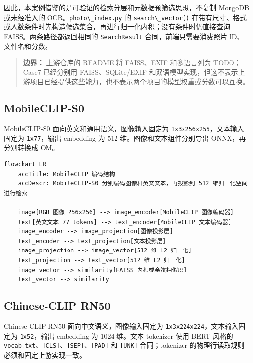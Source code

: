 因此，本案例借鉴的是可验证的检索分层和元数据预筛选思想，不复制 MongoDB
或未经准入的 OCR。\passthrough{\lstinline!photo\_index.py!} 的
\passthrough{\lstinline!search\_vector()!}
在带有尺寸、格式或人数条件时先构造候选集合，再进行归一化内积；没有条件时仍直接查询
FAISS。两条路径都返回相同的 \passthrough{\lstinline!SearchResult!}
合同，前端只需要消费照片 ID、文件名和分数。

\begin{quote}
\textbf{边界：} 上游仓库的 README 将 FAISS、EXIF 和多语言列为
TODO；Case7 已经分别用 FAISS、SQLite/EXIF
和双语模型实现，但这不表示上游项目已经提供这些能力，也不表示两个项目的模型权重或分数可以互换。
\end{quote}

\subsection{MobileCLIP-S0}\label{mobileclip-s0}

MobileCLIP-S0 面向英文和通用语义，图像输入固定为
\passthrough{\lstinline!1x3x256x256!}，文本输入固定为
\passthrough{\lstinline!1x77!}，输出 embedding 为 512
维。图像和文本组件分别导出 ONNX，再分别转换成 OM。

\begin{lstlisting}
flowchart LR
    accTitle: MobileCLIP 编码结构
    accDescr: MobileCLIP-S0 分别编码图像和英文文本，再投影到 512 维归一化空间进行检索

    image[RGB 图像 256x256] --> image_encoder[MobileCLIP 图像编码器]
    text[英文文本 77 tokens] --> text_encoder[MobileCLIP 文本编码器]
    image_encoder --> image_projection[图像投影层]
    text_encoder --> text_projection[文本投影层]
    image_projection --> image_vector[512 维 L2 归一化]
    text_projection --> text_vector[512 维 L2 归一化]
    image_vector --> similarity[FAISS 内积或余弦相似度]
    text_vector --> similarity
\end{lstlisting}

\subsection{Chinese-CLIP RN50}\label{chinese-clip-rn50}

Chinese-CLIP RN50 面向中文语义，图像输入固定为
\passthrough{\lstinline!1x3x224x224!}，文本输入固定为
\passthrough{\lstinline!1x52!}，输出 embedding 为 1024 维。文本
tokenizer 使用 BERT 风格的
\passthrough{\lstinline!vocab.txt!}、\passthrough{\lstinline![CLS]!}、\passthrough{\lstinline![SEP]!}、\passthrough{\lstinline![PAD]!}
和 \passthrough{\lstinline![UNK]!} 合同；tokenizer
的物理行读取规则必须和固定上游实现一致。

